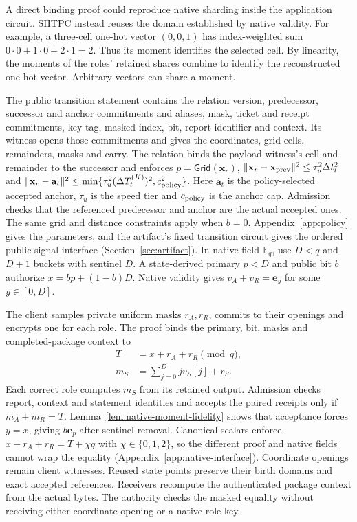 \documentclass[conference,compsoc]{IEEEtran}
\theoremstyle{definition}
\numberwithin{equation}{section}
\numberwithin{table}{section}
\numberwithin{figure}{section}
\theoremstyle{plain}
\begin{document}
A direct binding proof could reproduce native sharding inside the application
circuit. SHTPC instead reuses the domain established by native validity.
For example, a three-cell one-hot vector \((0,0,1)\) has index-weighted sum
\(0\cdot0+1\cdot0+2\cdot1=2\). Thus its moment identifies the selected
cell. By linearity, the moments of the roles' retained shares combine to
identify the reconstructed one-hot vector. Arbitrary vectors can share a moment.

The public transition statement contains the relation version, predecessor,
successor and anchor commitments and aliases, mask, ticket and receipt
commitments, key tag, masked index, bit, report identifier and context. Its
witness opens those commitments and gives the coordinates, grid cells,
remainders, masks and carry. The relation binds the payload witness's cell and
remainder to the successor and enforces
\(p=\mathsf{Grid}(\mathbf x_r)\),
\(\|\mathbf x_r-\mathbf x_{\rm prev}\|^2\le\tau_u^2\Delta t_t^2\) and
\(\|\mathbf x_r-\mathbf a_t\|^2\le
\min\{\tau_u^2(\Delta T_t^{(K)})^2,c_{\rm policy}^2\}\).
Here \(\mathbf a_t\) is the policy-selected accepted anchor, \(\tau_u\) is the
speed tier and \(c_{\rm policy}\) is the anchor cap. Admission checks that the
referenced predecessor and anchor are the actual accepted ones. The same grid
and distance constraints apply when \(b=0\). Appendix~\ref{app:policy} gives
the parameters, and the artifact's fixed transition circuit gives the ordered
public-signal interface (Section~\ref{sec:artifact}). In native field \(\mathbb F_q\), use \(D<q\) and
\(D+1\) buckets with sentinel \(D\). A state-derived primary \(p<D\) and
public bit \(b\) authorize \(x=bp+(1-b)D\). Native validity gives
\(v_A+v_R=\mathbf e_y\) for some \(y\in[0,D]\).

The client samples private uniform masks \(r_A,r_R\), commits to their openings
and encrypts one for each role. The proof binds the primary, bit, masks and
completed-package context to
\begin{equation}
 \begin{aligned}
 T   &=x+r_A+r_R\pmod q,\\
 m_S &=\sum_{j=0}^{D}jv_S[j]+r_S.
 \end{aligned}
 \label{eq:native-moment}
\end{equation}
Each correct role computes \(m_S\) from its retained output. Admission checks
report, context and statement identities and accepts the paired receipts only
if \(m_A+m_R=T\). Lemma~\ref{lem:native-moment-fidelity} shows that acceptance forces
\(y=x\), giving \(b\mathbf e_p\) after sentinel removal. Canonical scalars enforce
\(x+r_A+r_R=T+\chi q\) with \(\chi\in\{0,1,2\}\), so the different proof and
native fields cannot wrap the equality (Appendix~\ref{app:native-interface}).
Coordinate openings remain client witnesses. Reused state points preserve their
birth domains and exact accepted references.
Receivers recompute the authenticated package context from the actual bytes.
The authority checks the masked equality without receiving either coordinate
opening or a native role key.
\end{document}
